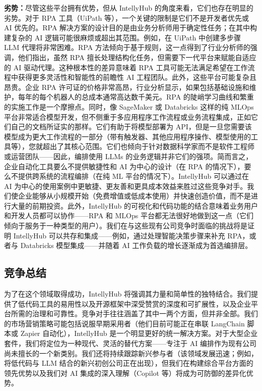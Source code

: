 \documentclass[11pt, a4paper, oneside]{article}
\begin{document}
\textbf{劣势：}尽管这些平台拥有优势，但从 IntellyHub 的角度来看，它们也存在明显的劣势。对于 RPA 工具（UiPath 等），一个关键的限制是它们不是开发者优先或 AI 优先的。RPA 解决方案的设计目的是由业务分析师用于确定性任务；在其中构建复杂的 AI 逻辑可能很麻烦或超出其范围。例如，在 UiPath 中创建多步骤 LLM 代理将非常困难。RPA 方法倾向于基于规则，这一点得到了行业分析师的强调，他们指出，虽然 RPA 擅长处理结构化任务，但需要下一代平台来赋能自适应的 AI 驱动代理\cite{forresterRPAvsAI}。这种根本性的差异意味着 RPA 工具可能无法满足希望在工作流程中获得更多灵活性和智能性的前瞻性 AI 工程团队。此外，这些平台可能复杂且昂贵。企业 RPA 许可证的价格非常高昂，行业分析显示，如果包括基础设施和维护，每年的每个机器人的总成本通常高达数千美元。RPA 的陡峭学习曲线和繁重的实施工作是一个摩擦点。同时，像 SageMaker 或 Databricks 这样的纯 MLOps 平台非常适合模型开发，但不侧重于多应用程序工作流程或业务流程集成，正如它们自己的文档所证实的那样\cite{awsSagemaker}。它们有助于将模型部署为 API，但是一旦您需要该模型成为更大工作流程的一部分（带有触发器、其他应用程序操作、模型使用的工具等），您就超出了其核心范围。它们也倾向于针对数据科学家而不是软件工程师或运营团队——因此，编排使用 LLMs 的业务逻辑并非它们的强项。简而言之，企业自动化工具要么不提供敏捷性和 AI 为中心的设计（在 RPA 的情况下），要么不提供跨系统的流程编排（在纯 ML 平台的情况下）。IntellyHub 可以通过在 AI 为中心的使用案例中更敏捷、更友善和更具成本效益来胜过这些竞争对手。我们使企业能够从小规模开始（免费增值或低成本使用）并快速创造价值，而不是进行大量的前期投资。此外，IntellyHub 的可视化和代码功能的结合意味着业务用户和开发人员都可以协作——RPA 和 MLOps 平台都无法很好地做到这一点（它们倾向于服务于一种类型的用户）。我们在与这些现有公司竞争时面临的挑战将是证明 IntellyHub 可以共存和集成——例如，通过处理智能决策步骤来补充 RPA，或者与 Databricks 模型集成——并随着 AI 工作负载的增长逐渐成为首选编排层。

\subsection{竞争总结}

为了在这个领域取得成功，IntellyHub 将强调其力量和简单性的独特结合。我们提供了低代码工具的易用性以及开源框架中深受赞赏的深度和可扩展性，以及企业平台所需的治理和可靠性。竞争对手往往涵盖了其中一两个方面，但并非全部。我们的市场营销策略可能包括说服早期采用者（他们目前可能正在串联 LangChain 脚本或 Zapier 自动化），IntellyHub 是一个明显更好的统一解决方案。对于大型企业套件，我们将定位为一种现代、灵活的替代方案——专注于 AI 编排作为现有公司尚未擅长的一个新类别。我们还将持续跟踪新兴参与者（该领域发展迅速；例如，将低代码与 LLM 结合的新兴初创公司正在出现），但我们在构建综合平台方面的领先优势以及我们对 AI 集成的深入理解（Copilot 等）将成为可防御的差异化优势。
\end{document}
